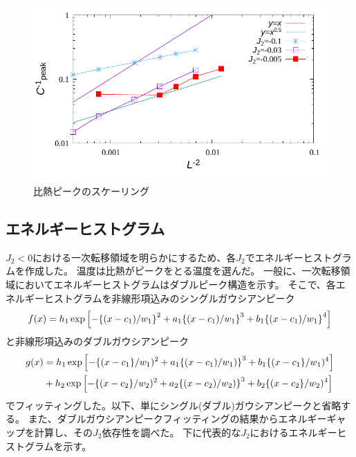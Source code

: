 \documentclass[12pt,titlepage,dvipdfmx]{jarticle}
\begin{document}

\begin{figure}[H]
   \centering
   \includegraphics[width=12cm]{figure/scaling_c.pdf}
   \caption{比熱ピークのスケーリング}
\end{figure}

\newpage

\subsection{エネルギーヒストグラム}
$J_2<0$における一次転移領域を明らかにするため、各$J_2$でエネルギーヒストグラムを作成した。
温度は比熱がピークをとる温度を選んだ。
一般に、一次転移領域においてエネルギーヒストグラムはダブルピーク構造を示す。
そこで、各エネルギーヒストグラムを非線形項込みのシングルガウシアンピーク
\begin{align}
   f(x)  = h_1\exp\qty[-\qty{(x-c_1)/w_1}^2 + a_1\qty{(x-c_1)/w_1}^3 + b_1\qty{(x-c_1)/w_1}^4]
\end{align}
と非線形項込みのダブルガウシアンピーク
\begin{align}
   g(x) &= h_1\exp\qty[-\qty{(x-c_1}/w_1)^2 + a_1\qty{(x-c_1)/w_1)}^3 + b_1\qty{(x-c_1}/w_1)^4] \nonumber\\ 
        &+ h_2\exp\qty[-\qty{(x-c_2}/w_2)^2 + a_2\qty{(x-c_2)/w_2)}^3 + b_2\qty{(x-c_2}/w_2)^4]
\end{align}
でフィッティングした。以下、単にシングル(ダブル)ガウシアンピークと省略する。
また、ダブルガウシアンピークフィッティングの結果からエネルギーギャップを計算し、その$J_2$依存性を調べた。
下に代表的な$J_2$におけるエネルギーヒストグラムを示す。
\end{document}

